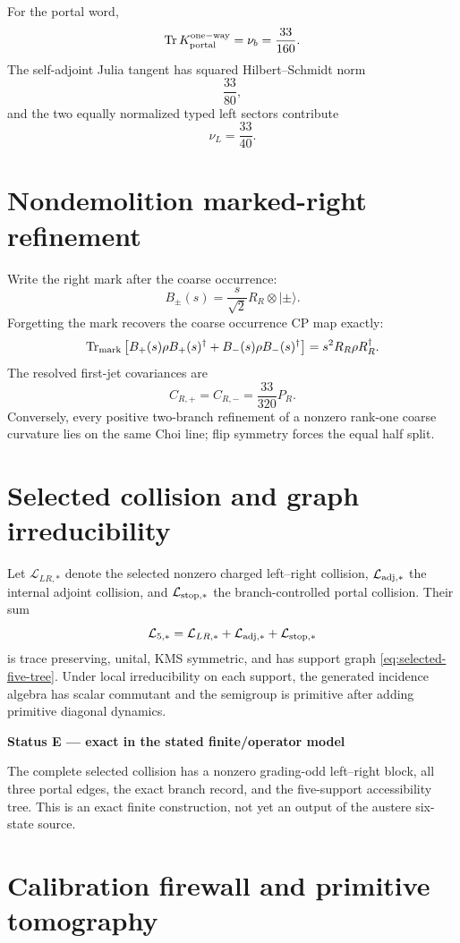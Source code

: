 \documentclass[11pt,oneside,openany]{book}
\numberwithin{equation}{chapter}
\theoremstyle{definition}
\theoremstyle{remark}
\newcommand{\Tr}{\operatorname{Tr}}
\newenvironment{statusbox}[2]{%
  \par\medskip\noindent
  \begin{center}\begin{minipage}{0.94\textwidth}
  \colorbox{#1!8}{\parbox{\dimexpr\linewidth-2\fboxsep\relax}{\textbf{#2}}}\par\smallskip
}{%
  \end{minipage}\end{center}\medskip
}
\newcommand{\Exact}[1]{\begin{statusbox}{ExactColor}{Status E --- exact in the stated finite/operator model}#1\end{statusbox}}
\begin{document}
For the portal word,
\[
 \Tr K_{\rm portal}^{\rm one-way}
 =
 \nu_b
 =
 \frac{33}{160}.
\]
The self-adjoint Julia tangent has squared Hilbert--Schmidt norm
\[
 \frac{33}{80},
\]
and the two equally normalized typed left sectors contribute
\[
 \boxed{\nu_L=\frac{33}{40}.}
\]

\section{Nondemolition marked-right refinement}

Write the right mark after the coarse occurrence:
\[
 B_\pm(s)
 =
 \frac{s}{\sqrt2}R_R\otimes|\pm\rangle.
\]
Forgetting the mark recovers the coarse occurrence CP map exactly:
\[
 \Tr_{\rm mark}
 \left[
 B_+(s)\rho B_+(s)^\dagger
 +
 B_-(s)\rho B_-(s)^\dagger
 \right]
 =
 s^2R_R\rho R_R^\dagger.
\]
The resolved first-jet covariances are
\[
 \boxed{
 C_{R,+}=C_{R,-}
 =
 \frac{33}{320}P_R.}
\]
Conversely, every positive two-branch refinement of a nonzero rank-one
coarse curvature lies on the same Choi line; flip symmetry forces the equal
half split.

\section{Selected collision and graph irreducibility}

Let \(\mathcal L_{LR,*}\) denote the selected nonzero charged left--right
collision, \(\mathcal L_{\rm adj,*}\) the internal adjoint collision, and
\(\mathcal L_{\rm stop,*}\) the branch-controlled portal collision.  Their sum
\[
 \mathcal L_{5,*}
 =
 \mathcal L_{LR,*}
 +
 \mathcal L_{\rm adj,*}
 +
 \mathcal L_{\rm stop,*}
\]
is trace preserving, unital, KMS symmetric, and has support graph
\eqref{eq:selected-five-tree}.  Under local irreducibility on each support,
the generated incidence algebra has scalar commutant and the semigroup is
primitive after adding primitive diagonal dynamics.

\Exact{The complete selected collision has a nonzero grading-odd
left--right block, all three portal edges, the exact branch record, and the
five-support accessibility tree.  This is an exact finite construction, not
yet an output of the austere six-state source.}

\section{Calibration firewall and primitive tomography}
\end{document}
